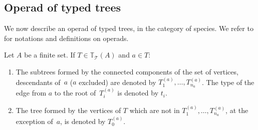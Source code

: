 \documentclass[10pt,a4paper]{amsart}
\numberwithin{equation}{section}
\newcommand{\T}{\mathcal{T}}
\newcommand{\bfT}{\mathbb{T}}
\begin{document}
\subsection{Operad of typed trees}

We now describe an operad of typed trees, in the category of species.
We refer to \cite{Dotsenko,Vallette,Markl} for notations and definitions on operads.

\begin{Notation} Let $A$ be a finite set. If $T\in \bfT_\T(A)$ and $a\in T$:
\begin{enumerate}\itemsep=0pt
\item The subtrees formed by the connected components of the set of vertices, descendants of~$a$ ($a$ excluded)
are denoted by $T_1^{(a)},\dots,T_{n_a}^{(a)}$.
The type of the edge from $a$ to the root of~$T_i^{(a)}$ is denoted by $t_i$.
\item The tree formed by the vertices of $T$ which are not in $T_1^{(a)},\dots,T_{n_a}^{(a)}$,
at the exception of~$a$, is denoted by $T_0^{(a)}$.
\end{enumerate}
\end{Notation}
\end{document}
